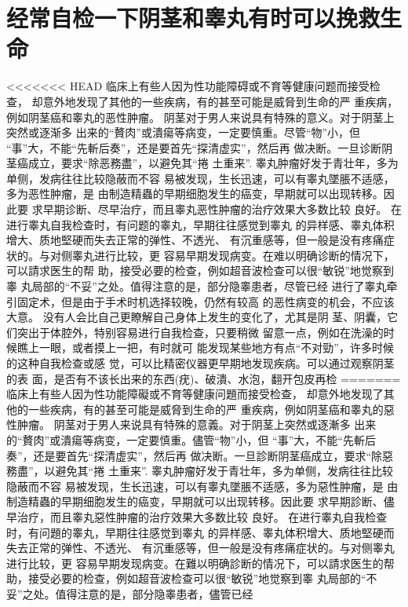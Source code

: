 \documentclass[12pt,UTF8]{ctexbook}
\begin{document}
\section{经常自检一下阴茎和睾丸有时可以挽救生命}

<<<<<<< HEAD
临床上有些人因为性功能障碍或不育等健康问题而接受检查，
却意外地发现了其他的一些疾病，有的甚至可能是威脅到生命的严
重疾病，例如阴茎癌和睾丸的恶性肿瘤。
阴茎对于男人来说具有特殊的意义。对于阴茎上突然或逐渐多
出来的“贅肉”或潰瘍等病变，一定要慎重。尽管“物”小，但
“事”大，不能“先斬后奏”，还是要首先“探清虚实”，然后再
做决断。一旦诊断阴茎癌成立，要求“除恶務盡”，以避免其“捲
土重来”.
睾丸肿瘤好发于青壮年，多为单侧，发病往往比较隐蔽而不容
易被发现，生长迅速，可以有睾丸墜脹不适感，多为恶性肿瘤，是
由制造精蟲的早期细胞发生的癌变，早期就可以出现转移。因此要
求早期诊断、尽早治疗，而且睾丸恶性肿瘤的治疗效果大多数比较
良好。
在进行睾丸自我检查时，有问题的睾丸，早期往往感觉到睾丸
的异样感、睾丸体积增大、质地堅硬而失去正常的弹性、不透光、
有沉重感等，但一般是没有疼痛症状的。与对侧睾丸进行比较，更
容易早期发现病变。在难以明确诊断的情况下，可以請求医生的帮
助，接受必要的检查，例如超音波检查可以很“敏锐”地觉察到睾
丸局部的“不妥”之处。值得注意的是，部分隐睾患者，尽管已经
进行了睾丸牵引固定术，但是由于手术时机选择较晚，仍然有较高
的恶性病变的机会，不应该大意。
没有人会比自己更瞭解自己身体上发生的变化了，尤其是阴
茎、阴囊，它们突出于体腔外，特别容易进行自我检查，只要稍微
留意一点，例如在洗澡的时候瞧上一眼，或者摸上一把，有时就可
能发现某些地方有点“不对勁”，许多时候的这种自我检查或感
觉，可以比精密仪器更早期地发现疾病。可以通过观察阴茎的表
面，是否有不该长出来的东西(疣)、破潰、水泡，翻开包皮再检
=======
临床上有些人因为性功能障礙或不育等健康问題而接受检查，
却意外地发现了其他的一些疾病，有的甚至可能是威脅到生命的严
重疾病，例如阴茎癌和睾丸的惡性肿瘤。
阴茎对于男人来说具有特殊的意義。对于阴茎上突然或逐漸多
出来的“贅肉”或潰瘍等病变，一定要慎重。儘管“物”小，但
“事”大，不能“先斬后奏”，还是要首先“探清虚实”，然后再
做决断。一旦診断阴茎癌成立，要求“除惡務盡”，以避免其“捲
土重来”.
睾丸肿瘤好发于青壮年，多为单侧，发病往往比较隐蔽而不容
易被发现，生长迅速，可以有睾丸墜脹不适感，多为惡性肿瘤，是
由制造精蟲的早期细胞发生的癌变，早期就可以出现转移。因此要
求早期診断、儘早治疗，而且睾丸惡性肿瘤的治疗效果大多数比较
良好。
在进行睾丸自我检查时，有问題的睾丸，早期往往感觉到睾丸
的异样感、睾丸体积增大、质地堅硬而失去正常的弹性、不透光、
有沉重感等，但一般是没有疼痛症状的。与对侧睾丸进行比较，更
容易早期发现病变。在難以明确診断的情况下，可以請求医生的帮
助，接受必要的检查，例如超音波检查可以很“敏锐”地觉察到睾
丸局部的“不妥”之处。值得注意的是，部分隐睾患者，儘管已经
\end{document}
